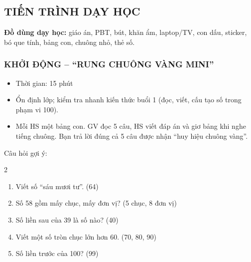 \documentclass[../main.tex]{subfiles}
\begin{document}
\subsection{TIẾN TRÌNH DẠY HỌC}
\textbf{Đồ dùng dạy học:} giáo án, PBT, bút, khăn ẩm, laptop/TV, con dấu, sticker, bó que tính, bảng con, chuông nhỏ, thẻ số.

\subsubsection{KHỞI ĐỘNG -- “RUNG CHUÔNG VÀNG MINI”}
\begin{hd}
    \begin{itemize}
        \item Thời gian: 15 phút
        \item Ổn định lớp; kiểm tra nhanh kiến thức buổi 1 (đọc, viết, cấu tạo số trong phạm vi 100).
    \end{itemize}
\end{hd}
\begin{itemize}
    \item Mỗi HS một bảng con. GV đọc 5 câu, HS viết đáp án và giơ bảng khi nghe tiếng chuông. Bạn trả lời đúng cả 5 câu được nhận “huy hiệu chuông vàng”.
\end{itemize}
\begin{vd}
    Câu hỏi gợi ý:
    \begin{multicols}{2}
    \begin{enumerate}
        \item Viết số “sáu mươi tư”. \hfill (64)
        \item Số 58 gồm mấy chục, mấy đơn vị? \hfill (5 chục, 8 đơn vị)
        \item Số liền sau của 39 là số nào? \hfill (40)
        \item Viết một số tròn chục lớn hơn 60. \hfill (70, 80, 90)
        \item Số liền trước của 100? \hfill (99)
    \end{enumerate}
    \end{multicols}
\end{vd}

\end{document}
